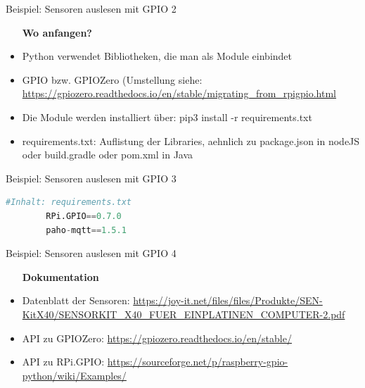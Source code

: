\begin{frame}{Beispiel: Sensoren auslesen mit GPIO 2}
    \begin{itemize}
    \setlength{\itemindent}{1in}
     \item [\textbf{ Wo anfangen?}]
    \end{itemize}
    \begin{itemize}
        \item  Python verwendet Bibliotheken, die man als Module einbindet
        \item  GPIO bzw. GPIOZero (Umstellung siehe: \url{https://gpiozero.readthedocs.io/en/stable/migrating_from_rpigpio.html}
        \item  Die Module werden installiert über:  pip3 install -r requirements.txt
        \item  requirements.txt: Auflistung der Libraries, aehnlich zu package.json in nodeJS oder build.gradle oder pom.xml in Java
     \end{itemize}
\end{frame}

\begin{frame}[fragile]{Beispiel: Sensoren auslesen mit GPIO 3}
    \begin{lstlisting}[language=Python, gobble=8]
        #Inhalt: requirements.txt
        RPi.GPIO==0.7.0
        paho-mqtt==1.5.1
    \end{lstlisting}
\end{frame}

\begin{frame}{Beispiel: Sensoren auslesen mit GPIO 4}
    \begin{itemize}
    \setlength{\itemindent}{1.0in}
     \item [\textbf{ Dokumentation}]
    \end{itemize}

    \begin{itemize}
        \item Datenblatt der Sensoren: \url{https://joy-it.net/files/files/Produkte/SEN-KitX40/SENSORKIT_X40_FUER_EINPLATINEN_COMPUTER-2.pdf}
        \item API zu GPIOZero: \url{https://gpiozero.readthedocs.io/en/stable/}
		\item API zu RPi.GPIO: \url{https://sourceforge.net/p/raspberry-gpio-python/wiki/Examples/}
     \end{itemize}
\end{frame}

